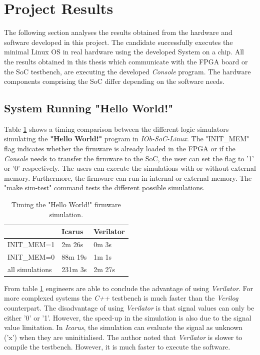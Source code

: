 \section{Project Results}
\label{sec:project_results}
The following section analyses the results obtained from the hardware and software developed in this project. The candidate successfully executes the minimal Linux OS in real hardware using the developed System on a chip. All the results obtained in this thesis which communicate with the FPGA board or the SoC testbench, are executing the developed \textit{Console} program. The hardware components comprising the SoC differ depending on the software needs.

\subsection{System Running "Hello World!"}

Table \ref{tab:hello_sim} shows a timing comparison between the different logic simulators simulating the \textbf{"Hello World!"} program in \textit{IOb-SoC-Linux}. The "INIT\_MEM" flag indicates whether the firmware is already loaded in the FPGA or if the \textit{Console} needs to transfer the firmware to the SoC, the user can set the flag to '1' or '0' respectively. The users can execute the simulations with or without external memory. Furthermore, the firmware can run in internal or external memory. The "make sim-test" command tests the different possible simulations.

\begin{table}[!ht]
    \centering
    \begin{tabular}{l|ll|}
    \cline{2-3}
                                          & \multicolumn{1}{l|}{\textbf{Icarus}}  & \textbf{Verilator} \\ \hline
    \multicolumn{1}{|l|}{INIT\_MEM=1}     & \multicolumn{1}{l|}{2m 26s}           & 0m 3s              \\ \hline
    \multicolumn{1}{|l|}{INIT\_MEM=0}     & \multicolumn{1}{l|}{88m 19s}          & 1m 1s              \\ \hline
    \multicolumn{1}{|l|}{all simulations} & \multicolumn{1}{l|}{231m 3s}          & 2m 27s             \\ \hline
    \end{tabular}
    \caption{Timing the "Hello World!" firmware simulation.}
    \label{tab:hello_sim}
\end{table}

From table \ref{tab:hello_sim} engineers are able to conclude the advantage of using \textit{Verilator}. For more complexed systems the \textit{C++} testbench is much faster than the \textit{Verilog} counterpart. The disadvantage of using \textit{Verilator} is that signal values can only be either '0' or '1'. However, the speed-up in the simulation is also due to the signal value limitation. In \textit{Icarus}, the simulation can evaluate the signal as unknown ('x') when they are uninitialised. The author noted that \textit{Verilator} is slower to compile the testbench. However, it is much faster to execute the software.

